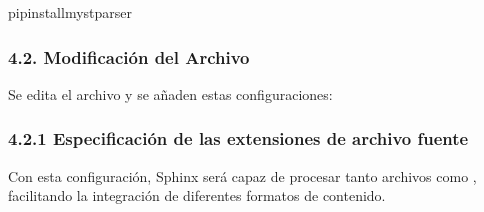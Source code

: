 \documentclass[a4paper,10pt,spanish]{sphinxmanual}
\begin{document}
\begin{sphinxVerbatim}[commandchars=\\\{\}]
pipinstallmyst\PYGZhy{}parser
\end{sphinxVerbatim}


\subsubsection{4.2. Modificación del Archivo }
\label{\detokenize{configuracion_inicial/003.Creacion_proyecto_Sphinx:modificacion-del-archivo-conf-py}}
\sphinxAtStartPar
Se edita el archivo  y se añaden estas configuraciones:

\begin{sphinxVerbatim}[commandchars=\\\{\}]
  \PYG{p}{[}
      
\PYG{p}{]}
\end{sphinxVerbatim}


\subsubsection{4.2.1 Especificación de las extensiones de archivo fuente}
\label{\detokenize{configuracion_inicial/003.Creacion_proyecto_Sphinx:especificacion-de-las-extensiones-de-archivo-fuente}}
\begin{sphinxVerbatim}[commandchars=\\\{\}]
  
       
       
\end{sphinxVerbatim}

\sphinxAtStartPar
Con esta configuración, Sphinx será capaz de procesar tanto archivos  como , facilitando la integración de diferentes formatos de contenido.
\end{document}
